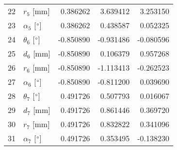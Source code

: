 \documentclass{standalone}%
\begin{document}
\begin{tabular}{llrrr}
22 &              $r_{5}$ [mm] &  0.386262 &   3.639412 &   3.253150 \\
23 &  $\alpha_{5}$ [$\degree$] &  0.386262 &   0.438587 &   0.052325 \\
24 &  $\theta_{6}$ [$\degree$] & -0.850890 &  -0.931486 &  -0.080596 \\
25 &              $d_{6}$ [mm] & -0.850890 &   0.106379 &   0.957268 \\
26 &              $r_{6}$ [mm] & -0.850890 &  -1.113413 &  -0.262523 \\
27 &  $\alpha_{6}$ [$\degree$] & -0.850890 &  -0.811200 &   0.039690 \\
28 &  $\theta_{7}$ [$\degree$] &  0.491726 &   0.507793 &   0.016067 \\
29 &              $d_{7}$ [mm] &  0.491726 &   0.861446 &   0.369720 \\
30 &              $r_{7}$ [mm] &  0.491726 &   0.832822 &   0.341096 \\
31 &  $\alpha_{7}$ [$\degree$] &  0.491726 &   0.353495 &  -0.138230 \\
\bottomrule
\end{tabular}
%
\end{document}

